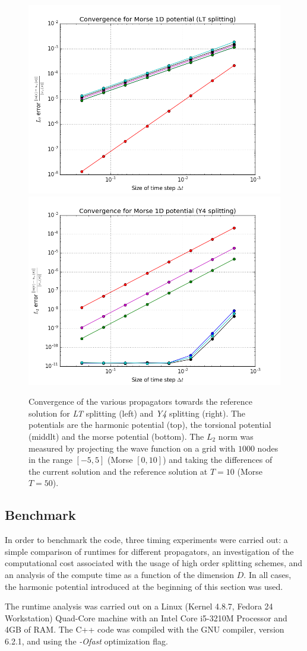 \begin{figure}[ht]
	\includegraphics[width=.45\textwidth]{figures/convergence_morse_1D_lt.png}
	\includegraphics[width=.45\textwidth]{figures/convergence_morse_1D_y4.png}
	\caption{Convergence of the various propagators towards the reference solution for \emph{LT} splitting (left) and \emph{Y4} splitting (right). The potentials are the harmonic potential (top), the torsional potential (middlt) and the morse potential (bottom). The $L_2$ norm was measured by projecting the wave function on a grid with $1000$ nodes in the range $[-5,5]$ (Morse $[0,10]$) and taking the differences of the current solution and the reference solution at $T=10$ (Morse $T=50$).}
	\label{fig:error_analysis}
\end{figure}

\subsection{Benchmark}
\label{subsec:benchmark}
%
In order to benchmark the code, three timing experiments were carried out: a simple comparison of runtimes for different propagators, an investigation of the computational cost associated with the usage of high order splitting schemes, and an analysis of the compute time as a function of the dimension $D$.
In all cases, the harmonic potential introduced at the beginning of this section was used.
\par\medskip
%
The runtime analysis was carried out on a Linux (Kernel 4.8.7, Fedora 24 Workstation) Quad-Core machine with an Intel Core i5-3210M Processor and
4GB of RAM. The C++ code was compiled with the GNU compiler, version 6.2.1, and using the \emph{-Ofast} optimization flag.



